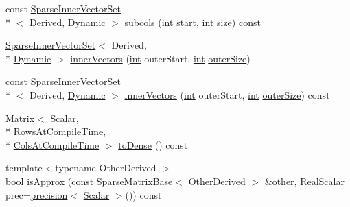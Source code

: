 \begin{DoxyCompactItemize}
\item 
const \hyperlink{class_sparse_inner_vector_set}{Sparse\-Inner\-Vector\-Set}\\*
$<$ Derived, \hyperlink{_constants_8h_adc9da5be31bdce40c25a92c27999c0e3}{Dynamic} $>$ \hyperlink{class_sparse_matrix_base_abd56a73e91acea80c12c7f93c89d34a0}{subcols} (\hyperlink{ioapi_8h_a787fa3cf048117ba7123753c1e74fcd6}{int} \hyperlink{glext_8h_a13be19455586e95d5a42ed8f054afad2}{start}, \hyperlink{ioapi_8h_a787fa3cf048117ba7123753c1e74fcd6}{int} \hyperlink{glext_8h_a014d89bd76f74ef3a29c8f04b473eb76}{size}) const 
\item 
\hyperlink{class_sparse_inner_vector_set}{Sparse\-Inner\-Vector\-Set}$<$ Derived, \\*
\hyperlink{_constants_8h_adc9da5be31bdce40c25a92c27999c0e3}{Dynamic} $>$ \hyperlink{class_sparse_matrix_base_a5dcbf4084780bc096c939e5bbe57da29}{inner\-Vectors} (\hyperlink{ioapi_8h_a787fa3cf048117ba7123753c1e74fcd6}{int} outer\-Start, \hyperlink{ioapi_8h_a787fa3cf048117ba7123753c1e74fcd6}{int} \hyperlink{class_sparse_matrix_base_ac7cdfac62bd36dea1d756c39a72a8a04}{outer\-Size})
\item 
const \hyperlink{class_sparse_inner_vector_set}{Sparse\-Inner\-Vector\-Set}\\*
$<$ Derived, \hyperlink{_constants_8h_adc9da5be31bdce40c25a92c27999c0e3}{Dynamic} $>$ \hyperlink{class_sparse_matrix_base_aa71a3a6bc842ea261a9c6c56e3bcec76}{inner\-Vectors} (\hyperlink{ioapi_8h_a787fa3cf048117ba7123753c1e74fcd6}{int} outer\-Start, \hyperlink{ioapi_8h_a787fa3cf048117ba7123753c1e74fcd6}{int} \hyperlink{class_sparse_matrix_base_ac7cdfac62bd36dea1d756c39a72a8a04}{outer\-Size}) const 
\item 
\hyperlink{class_matrix}{Matrix}$<$ \hyperlink{class_sparse_matrix_base_af39d70f2b7e775e9e17b666cd24128c8}{Scalar}, \\*
\hyperlink{class_sparse_matrix_base_af601f771c204b3ca254a52085525004ca6f1c32affc05e36001dd1643129f15a9}{Rows\-At\-Compile\-Time}, \\*
\hyperlink{class_sparse_matrix_base_af601f771c204b3ca254a52085525004ca121f168f43ca4df38f99335271cad6e4}{Cols\-At\-Compile\-Time} $>$ \hyperlink{class_sparse_matrix_base_a11f57ac5c136f1b70963796c1d25cccb}{to\-Dense} () const 
\item 
{\footnotesize template$<$typename Other\-Derived $>$ }\\bool \hyperlink{class_sparse_matrix_base_a0bcf6dc73a6266b613e78d7b3cb73e8a}{is\-Approx} (const \hyperlink{class_sparse_matrix_base}{Sparse\-Matrix\-Base}$<$ Other\-Derived $>$ \&other, \hyperlink{class_sparse_matrix_base_a615d56082efd03b5f31015cc4900e72f}{Real\-Scalar} prec=\hyperlink{_math_functions_8h_a3dc1c65cf9dc9b5a7ee66472d0ae83e1}{precision}$<$ \hyperlink{class_sparse_matrix_base_af39d70f2b7e775e9e17b666cd24128c8}{Scalar} $>$()) const 

\end{DoxyCompactItemize}
